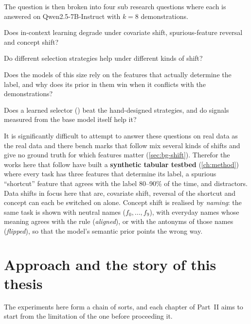 The question is then broken into four sub research questions where each is answered on Qwen2.5-7B-Instruct \citep{qwen2024qwen25} with $k = 8$ demonstrations.

\begin{description}[leftmargin=2.4em, style=nextline]
  \item[\RQ1] Does in-context learning degrade under covariate shift, spurious-feature reversal and concept shift?
  \item[\RQ2] Do different selection strategies help under different kinds of shift?
  \item[\RQ3] Does the models of this size rely on the features that actually determine the label, and why does its prior in them win when it conflicts with the demonstrations?
  \item[\RQ4] Does a learned selector (\sata) beat the hand-designed strategies, and do signals measured from the base model itself help it?
\end{description}


It is significantly difficult to attempt to answer these questions on real data as the real data and there bench marks that follow mix several kinds of shifts and give no ground truth for which features matter (\autoref{sec:bg-shift}). Therefor the works here that follow have built a \textbf{synthetic tabular testbed} (\autoref{ch:method}) where every task has three features that determine its label, a spurious ``shortcut'' feature that agrees with the label 80--90\% of the time, and distractors. Data shifts in focus here that are, covariate shift, reversal of the shortcut and concept can each be switched on alone. Concept shift is realised by \emph{naming}: the same task is shown with neutral names ($f_0, \ldots, f_9$), with everyday names whose meaning agrees with the rule (\emph{aligned}), or with the antonyms of those names (\emph{flipped}), so that the model's semantic prior points the wrong way.

\newpage
\section{Approach and the story of this thesis}

The experiments here form a chain of sorts, and each chapter of Part~II aims to start from the limitation of the one before proceeding it.

